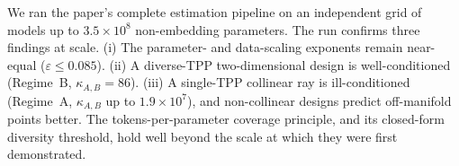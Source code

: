 \documentclass[11pt]{article}
\newcommand{\kAB}{\kappa_{A,B}}
\begin{document}
We ran the paper's complete estimation pipeline on an independent grid of models up to
$3.5\times10^{8}$ non-embedding parameters. The run confirms three findings at scale. (i) The
parameter- and data-scaling exponents remain near-equal ($\varepsilon\le0.085$). (ii) A
diverse-TPP two-dimensional design is well-conditioned (Regime~B, $\kAB=86$). (iii) A single-TPP
collinear ray is ill-conditioned (Regime~A, $\kAB$ up to $1.9\times10^{7}$), and non-collinear
designs predict off-manifold points better. The tokens-per-parameter coverage principle, and its closed-form
diversity threshold, hold well beyond the scale at which they were first
demonstrated.
\end{document}
